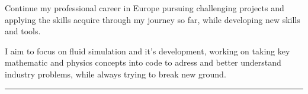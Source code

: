 \documentclass[a4paper,10pt]{article}
\newlength{\cvcolumngapwidth}
\newlength{\cvleftcolumnwidth}
\newlength{\cvrightcolumnwidth}
\newcommand{\cvsectionstyle}[1]{{\normalsize\cvsectionfont\textcolor{cvsectioncolor}{#1}}}
\newcommand{\cvheadingstyle}[1]{{\normalsize\cvheadingfont\textcolor{cvheadingcolor}{#1}}}
\newlength{\cvafteritemskipamount}
\newlength{\cvaftersectionskipamount}
\newlength{\cvbetweensectionandheadingextraskipamount}
\newlength{\cvparskip}
\newcommand{\cvsection}[1]{
    \begin{minipage}[t]{\cvleftcolumnwidth}
        \raggedleft\cvsectionstyle{#1}
    \end{minipage}%
    \hspace{\cvcolumngapwidth}%
    \begin{minipage}[t]{\cvrightcolumnwidth}
        \textcolor{cvrulecolor}{\rule{\cvrightcolumnwidth}{0.3mm}}
    \end{minipage}

    \vspace{\cvaftersectionskipamount}
}
\newcommand{\cvitem}[2]{
    \begin{minipage}[t]{\cvleftcolumnwidth}
        \raggedleft #1
    \end{minipage}%
    \hspace{\cvcolumngapwidth}%
    \begin{minipage}[t]{\cvrightcolumnwidth}
        \setlength{\parskip}{\cvparskip} #2
    \end{minipage}

    \vspace{\cvafteritemskipamount}
}
\begin{document}
\cvitem{\cvheadingstyle{}}{


    Continue my professional career in Europe pursuing challenging projects and applying the skills acquire through my journey so
    far, while developing new skills and tools.

    I aim to focus on fluid simulation and it's development, working on taking key mathematic and physics concepts into
    code to adress and better understand industry problems, while always trying to break new ground.
}


\cvsection{WORK EXPERIENCE}
\end{document}
